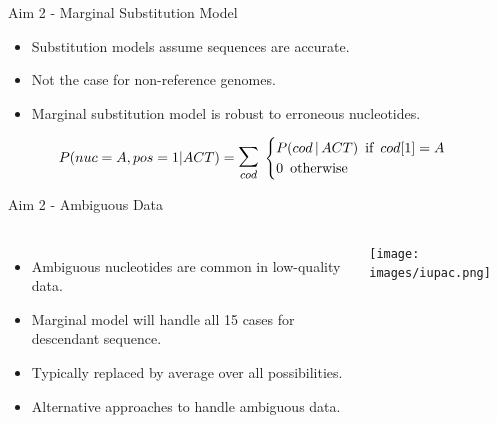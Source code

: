 \documentclass[aspectratio=169]{beamer}
\begin{document}
\begin{frame}{Aim 2 - Marginal Substitution Model} %
\begin{itemize}
	\setlength\itemsep{1em}
	\item Substitution models assume sequences are accurate.
	\item Not the case for non-reference genomes.
	\item Marginal substitution model is robust to erroneous nucleotides.
\end{itemize}
\vspace{2em}

\[P(nuc = A,pos = 1 | ACT) = \mathlarger{\mathlarger{\sum}}_{cod} \thickspace \begin{cases}
	P(cod \thinspace | \thinspace ACT) \enspace \text{if} \enspace cod[1] = A\\
	0 \enspace \text{otherwise}
\end{cases} \]

\end{frame} %

\begin{frame}{Aim 2 - Ambiguous Data} %
\begin{columns}
\begin{itemize}
	\setlength\itemsep{1em}
	\item Ambiguous nucleotides are common in low-quality data.
	\item Marginal model will handle all 15 cases for descendant sequence.
	\item Typically replaced by average over all possibilities.
	\item Alternative approaches to handle ambiguous data.
\end{itemize}
\texttt{[image: images/iupac.png]}
\end{columns}
\end{frame} %
\end{document}
